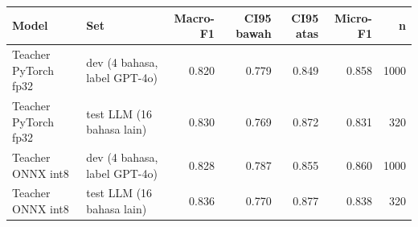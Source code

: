 \begin{tabular}{llrrrrr}
\toprule
Model & Set & Macro-F1 & CI95 bawah & CI95 atas & Micro-F1 & n \\
\midrule
Teacher PyTorch fp32 & dev (4 bahasa, label GPT-4o) & 0.820 & 0.779 & 0.849 & 0.858 & 1000 \\
Teacher PyTorch fp32 & test LLM (16 bahasa lain) & 0.830 & 0.769 & 0.872 & 0.831 & 320 \\
Teacher ONNX int8 & dev (4 bahasa, label GPT-4o) & 0.828 & 0.787 & 0.855 & 0.860 & 1000 \\
Teacher ONNX int8 & test LLM (16 bahasa lain) & 0.836 & 0.770 & 0.877 & 0.838 & 320 \\
\bottomrule
\end{tabular}
